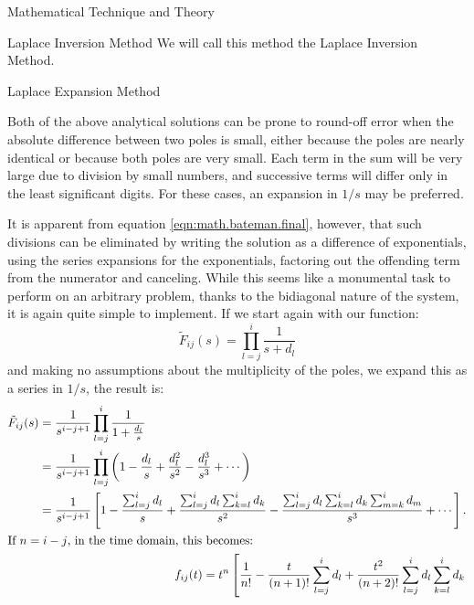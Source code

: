 \begin{chapter}{Mathematical Technique and Theory}
\begin{section}{Laplace Inversion Method}
  We will call this method the Laplace Inversion Method.

\end{section}  
  
\begin{section}{Laplace Expansion Method}\label{sec:math.expansion}
    
  Both of the above analytical solutions can be prone to round-off
  error when the absolute difference between two poles is small,
  either because the poles are nearly identical or because both poles
  are very small.  Each term in the sum will be very large due to
  division by small numbers, and successive terms will differ only in
  the least significant digits.  For these cases, an expansion in
  $1/s$ may be preferred.
    
  It is apparent from equation \ref{eqn:math.bateman.final}, however,
  that such divisions can be eliminated by writing the solution as a
  difference of exponentials, using the series expansions for the
  exponentials, factoring out the offending term from the numerator
  and canceling.  While this seems like a monumental task to perform
  on an arbitrary problem, thanks to the bidiagonal nature of the
  system, it is again quite simple to implement.  If we start again
  with our function:
  \begin{equation}
    \tilde{F}_{ij}(s) = \prod_{l=j}^{i}\frac{1}{s+d_l}
  \end{equation}
  and making no assumptions about the multiplicity of the poles, we
  expand this as a series in $1/s$, the result is:
  \begin{align}
    \begin{split}
      \tilde{F}_{ij}(s) &=\frac{1}{s^{i-j+1}} \prod_{l=j}^i\frac{1}{1+\frac{d_l}{s}}\\
      &=\frac{1}{s^{i-j+1}} \prod_{l=j}^i 
      \left(1 - \frac{d_l}{s} + \frac{d_l^2}{s^2} - \frac{d_l^3}{s^3} + \cdots \right )\\
      &= \frac{1}{s^{i-j+1}} \left [ 1 - \frac{\sum_{l=j}^i d_l}{s} +
        \frac{\sum_{l=j}^{i}d_l\sum_{k=l}^i d_k}{s^2} - 
        \frac{\sum_{l=j}^{i}d_l \sum_{k=l}^i d_k \sum_{m=k}^i d_m}{s^3} + \cdots
      \right ].
    \end{split}\\
    \intertext{If $n=i-j$, in the time domain, this becomes:}
    \begin{split}
      f_{ij}(t) &= t^{n} \left[ \frac{1}{n!} - \frac{t}{(n+1)!}\sum_{l=j}^i d_l 
        +\frac{t^2}{(n+2)!}\sum_{l=j}^{i}d_l \sum_{k=l}^i d_k\right.\\  

\end{split}
\end{align}
\end{section}
\end{chapter}
